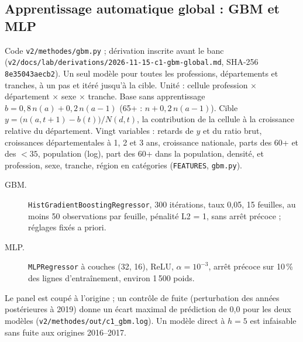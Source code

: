 \subsection{Apprentissage automatique global : GBM et MLP}
\label{met:gbm}
Code \texttt{v2/methodes/gbm.py} ; dérivation inscrite avant le banc
(\texttt{v2/docs/lab/derivations/2026-11-15-c1-gbm-global.md}, SHA-256 \texttt{8e35043aecb2}). Un seul
modèle pour toutes les professions, départements et tranches, à un pas et itéré jusqu'à la cible. Unité :
cellule profession $\times$ département $\times$ sexe $\times$ tranche. Base sans apprentissage
$b = 0{,}8\,n(a) + 0{,}2\,n(a-1)$ (65+ : $n + 0{,}2\,n(a-1)$). Cible
$y = \big(n(a,t+1) - b(t)\big)/N(d,t)$, la contribution de la cellule à la croissance relative du
département. Vingt variables : retards de $y$ et du ratio brut, croissances départementales à 1, 2 et 3 ans,
croissance nationale, parts des 60+ et des $<35$, population (log), part des 60+ dans la population,
densité, et profession, sexe, tranche, région en catégories (\texttt{FEATURES}, \texttt{gbm.py}).
\begin{description}
  \item[GBM.] \texttt{HistGradientBoostingRegressor}, 300 itérations, taux 0,05, 15 feuilles, au moins 50
    observations par feuille, pénalité L2 = 1, sans arrêt précoce ; réglages fixés a priori\suppose.
  \item[MLP.] \texttt{MLPRegressor} à couches (32, 16), ReLU, $\alpha = 10^{-3}$, arrêt précoce sur 10\,\% des
    lignes d'entraînement, environ 1\,500\derive{} poids.
\end{description}
Le panel est coupé à l'origine ; un contrôle de fuite (perturbation des années postérieures à 2019) donne
un écart maximal de prédiction de 0,0\mesure{} pour les deux modèles (\texttt{v2/methodes/out/c1\_gbm.log}).
Un modèle direct à $h = 5$ est infaisable sans fuite aux origines 2016--2017\derive.

